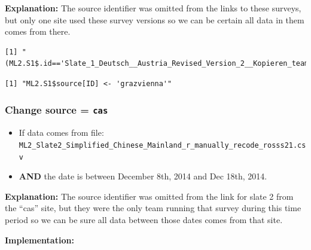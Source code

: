 \documentclass[]{article}
\newenvironment{Shaded}{\begin{snugshade}}{\end{snugshade}}
\newcommand{\DecValTok}[1]{\textcolor[rgb]{0.86,0.86,0.80}{{#1}}}
\newcommand{\StringTok}[1]{\textcolor[rgb]{0.80,0.58,0.58}{{#1}}}
\newcommand{\CommentTok}[1]{\textcolor[rgb]{0.50,0.62,0.50}{{#1}}}
\newcommand{\NormalTok}[1]{\textcolor[rgb]{0.80,0.80,0.80}{{#1}}}
\begin{document}
\textbf{Explanation:} The source identifier was omitted from the links
to these surveys, but only one site used these survey versions so we can
be certain all data in them comes from there.

\begin{Shaded}
\end{Shaded}

\begin{verbatim}
[1] "(ML2.S1$.id=='Slate_1_Deutsch__Austria_Revised_Version_2__Kopieren_teamb_r_manuallyrecode_vanp21_text.csv')"
\end{verbatim}

\begin{Shaded}
\end{Shaded}

\begin{verbatim}
[1] "ML2.S1$source[ID] <- 'grazvienna'"
\end{verbatim}

\subsubsection{\textbf{Change} source =
\texttt{cas}}\label{change-source-cas}

\begin{itemize}
\itemsep1pt\parskip0pt
\item
  If data comes from file:
  \texttt{ML2\_Slate2\_Simplified\_Chinese\_Mainland\_r\_manually\_recode\_rosss21.csv}
\item
  \textbf{AND} the date is between December 8th, 2014 and Dec 18th,
  2014.
\end{itemize}

\textbf{Explanation:} The source identifier was omitted from the link
for slate 2 from the ``cas'' site, but they were the only team running
that survey during this time period so we can be sure all data between
those dates comes from that site.

\textbf{Implementation:}

\begin{Shaded}
\end{Shaded}
\end{document}
